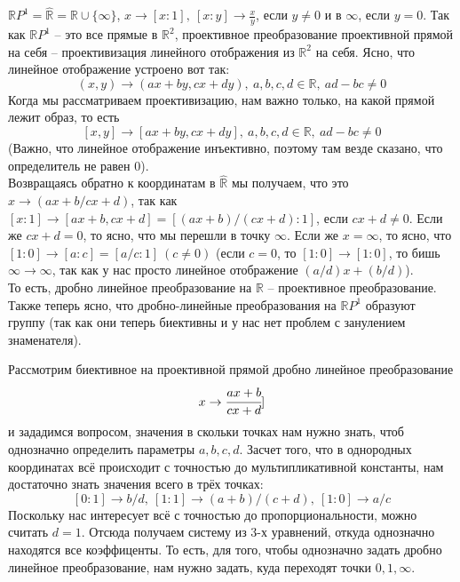 \documentclass[11pt]{article}
\begin{document}
    \begin{example}
        $ \mathbb{R}P^1 = \widehat{\mathbb{R}} = \mathbb{R} \cup \{ \infty \}$, $x \to [x : 1], \ [x : y] \to \frac{x}{y}$, если $y \neq 0$ и в $\infty$, если $y = 0$.
        Так как $\mathbb{R}P^1$ -- это все прямые в $\mathbb{R}^2$, проективное преобразование проективной прямой на себя -- проективизация линейного отображения из $\mathbb{R}^2$ на себя. Ясно, что линейное отображение устроено вот так:
        \[ (x,  y) \to (ax + by , cx + dy), \ a, b, c, d \in \mathbb{R}, \ ad - bc \neq 0 \]
        Когда мы рассматриваем проективизацию, нам важно только, на какой прямой лежит образ, то есть
        \[ [x,  y] \to [ax + by , cx + dy], \ a, b, c, d \in \mathbb{R}, \ ad - bc \neq 0 \]
        (Важно, что линейное отображение инъективно, поэтому там везде сказано, что определитель не равен 0).\\
        Возвращаясь обратно к координатам в $\widehat{\mathbb{R}}$ мы получаем, что это $x \to (ax + b / cx + d)$, так как $[x : 1] \to [ax + b, cx + d] = [(ax + b) / (cx + d) : 1]$, если $cx + d \neq 0$. Если же $cx + d = 0$, то ясно, что мы перешли в точку $\infty$. Если же $x = \infty$, то ясно, что $[1 : 0] \to [a : c] = [a / c : 1] \ (c \neq 0)$ (если $c = 0$, то $[1 : 0] \to [1 : 0]$, то бишь $\infty \to \infty$, так как у нас просто линейное отображение $(a /d)x + (b / d)$).\\
        То есть, дробно линейное преобразование на $\mathbb{R}$ -- проективное преобразование. Также теперь ясно, что дробно-линейные преобразования на $\mathbb{R}P^1$ образуют группу (так как они теперь биективны и у нас нет проблем с занулением знаменателя).
    \end{example}

    \begin{example}
    Рассмотрим  биективное на проективной прямой дробно линейное преобразование
        \[ x \to \cfrac{ax + b}{cx + d}]\]
        и зададимся вопросом, значения в скольки точках нам нужно знать, чтоб однозначно определить параметры $a, b, c, d$. Засчет того, что в однородных координатах всё происходит с точностью до мультипликативной константы, нам достаточно знать значения всего в трёх точках:
        \[ [0 : 1] \to b / d, \ [1 : 1] \to (a + b) / (c + d), \ [1 : 0] \to a / c\]
        Поскольку нас интересует всё с точностью до пропорциональности, можно считать $d = 1$. Отсюда получаем систему из 3-х уравнений, откуда однозначно находятся все коэффиценты. То есть, для того, чтобы однозначно задать дробно линейное преобразование, нам нужно задать, куда переходят точки $0, 1, \infty$.
    \end{example}
\end{document}

